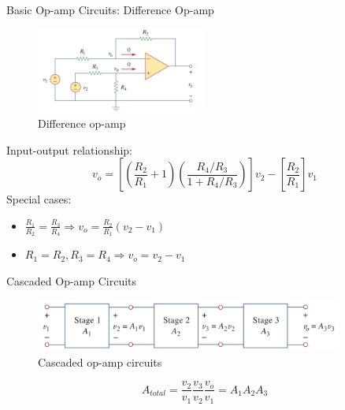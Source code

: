 \documentclass{beamer}
\begin{document}
\begin{frame}{Basic Op-amp Circuits: Difference Op-amp}

\begin{figure}[H]
    \centering
    \includegraphics[width=0.5\textwidth]{img_opamp/9_difference.png}
    \caption{Difference op-amp}
\end{figure}
Input-output relationship:
$$v_o = \left[ (\frac{R_2}{R_1}+1)(\frac{R_4/R_3}{1+R_4/R_3})\right]v_2 - \left[\frac{R_2}{R_1}\right]v_1$$
Special cases:
\begin{itemize}
    \item $\frac{R_1}{R_2}=\frac{R_3}{R_4} \Rightarrow v_o = \frac{R_2}{R_1}(v_2-v_1)$
    \item $R_1 = R_2, R_3 = R_4 \Rightarrow v_o = v_2-v_1$
\end{itemize}

    
\end{frame}


\begin{frame}{Cascaded Op-amp Circuits}
\begin{figure}[H]
    \centering
    \includegraphics[width=0.9\textwidth]{img_opamp/10_cascaded.png}
    \caption{Cascaded op-amp circuits}
\end{figure}

$$A_{total} =\frac{v_2}{v_1}\frac{v_3}{v_2}\frac{v_o}{v_1} =  A_1A_2A_3$$

    
\end{frame}
\end{document}
